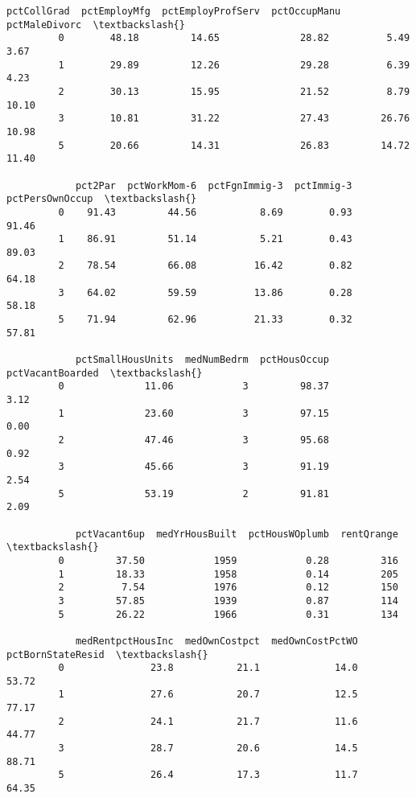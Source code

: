 \documentclass[11pt]{llncs}
\begin{document}
\begin{Verbatim}[commandchars=\\\{\}]
            pctCollGrad  pctEmployMfg  pctEmployProfServ  pctOccupManu  pctMaleDivorc  \textbackslash{}
         0        48.18         14.65              28.82          5.49           3.67   
         1        29.89         12.26              29.28          6.39           4.23   
         2        30.13         15.95              21.52          8.79          10.10   
         3        10.81         31.22              27.43         26.76          10.98   
         5        20.66         14.31              26.83         14.72          11.40   
         
            pct2Par  pctWorkMom-6  pctFgnImmig-3  pctImmig-3  pctPersOwnOccup  \textbackslash{}
         0    91.43         44.56           8.69        0.93            91.46   
         1    86.91         51.14           5.21        0.43            89.03   
         2    78.54         66.08          16.42        0.82            64.18   
         3    64.02         59.59          13.86        0.28            58.18   
         5    71.94         62.96          21.33        0.32            57.81   
         
            pctSmallHousUnits  medNumBedrm  pctHousOccup  pctVacantBoarded  \textbackslash{}
         0              11.06            3         98.37              3.12   
         1              23.60            3         97.15              0.00   
         2              47.46            3         95.68              0.92   
         3              45.66            3         91.19              2.54   
         5              53.19            2         91.81              2.09   
         
            pctVacant6up  medYrHousBuilt  pctHousWOplumb  rentQrange  \textbackslash{}
         0         37.50            1959            0.28         316   
         1         18.33            1958            0.14         205   
         2          7.54            1976            0.12         150   
         3         57.85            1939            0.87         114   
         5         26.22            1966            0.31         134   
         
            medRentpctHousInc  medOwnCostpct  medOwnCostPctWO  pctBornStateResid  \textbackslash{}
         0               23.8           21.1             14.0              53.72   
         1               27.6           20.7             12.5              77.17   
         2               24.1           21.7             11.6              44.77   
         3               28.7           20.6             14.5              88.71   
         5               26.4           17.3             11.7              64.35   
         

\end{Verbatim}
\end{document}
